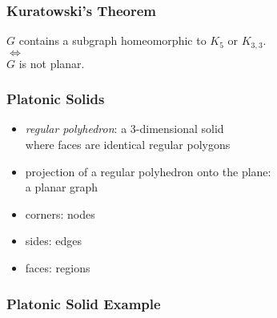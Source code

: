 \documentclass[dvipsnames]{beamer}
\begin{document}
\begin{frame}
  \frametitle{Kuratowski's Theorem}

  \begin{theorem}
    \begin{center}
      $G$ contains a subgraph homeomorphic to $K_5$ or $K_{3,3}$.\\
      $\Leftrightarrow$\\
      $G$ is not planar.
    \end{center}
  \end{theorem}
\end{frame}

\begin{frame}
  \frametitle{Platonic Solids}

  \begin{itemize}
    \item \emph{regular polyhedron}: a 3-dimensional solid\\
      where faces are identical regular polygons

    \bigskip
    \item projection of a regular polyhedron onto the plane:\\
      a planar graph
    \smallskip
    \item corners: nodes
    \item sides: edges
    \item faces: regions
  \end{itemize}
\end{frame}

\begin{frame}
  \frametitle{Platonic Solid Example}

  \begin{columns}
    \begin{center}
    \end{center}

    \begin{center}
    \end{center}
  \end{columns}
\end{frame}
\end{document}
